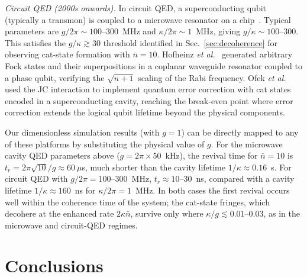 \documentclass[12pt]{iopart}
\begin{document}
\textit{Circuit QED (2000s onwards).} In circuit QED, a superconducting qubit (typically a transmon) is coupled to a microwave resonator on a chip~\cite{blais2021}. Typical parameters are $g/2\pi \sim 100$--$300$~MHz and $\kappa/2\pi \sim 1$~MHz, giving $g/\kappa \sim 100$--$300$. This satisfies the $g/\kappa \gtrsim 30$ threshold identified in Sec.~\ref{sec:decoherence} for observing cat-state formation with $\bar{n} = 10$. Hofheinz \textit{et al.}~\cite{hofheinz2009} generated arbitrary Fock states and their superpositions in a coplanar waveguide resonator coupled to a phase qubit, verifying the $\sqrt{n+1}$ scaling of the Rabi frequency. Ofek \textit{et al.}~\cite{ofek2016} used the JC interaction to implement quantum error correction with cat states encoded in a superconducting cavity, reaching the break-even point where error correction extends the logical qubit lifetime beyond the physical components.

Our dimensionless simulation results (with $g = 1$) can be directly mapped to any of these platforms by substituting the physical value of $g$. For the microwave cavity QED parameters above ($g = 2\pi \times 50$~kHz), the revival time for $\bar{n} = 10$ is $t_r = 2\pi\sqrt{10}/g \approx 60~\mu$s, much shorter than the cavity lifetime $1/\kappa \approx 0.16$~s. For circuit QED with $g/2\pi = 100$--$300$~MHz, $t_r \approx 10$--$30$~ns, compared with a cavity lifetime $1/\kappa \approx 160$~ns for $\kappa/2\pi = 1$~MHz. In both cases the first revival occurs well within the coherence time of the system; the cat-state fringes, which decohere at the enhanced rate $2\kappa\bar{n}$, survive only where $\kappa/g \lesssim 0.01$--$0.03$, as in the microwave and circuit-QED regimes.


\section{Conclusions}
\label{sec:conclusions}
\end{document}
